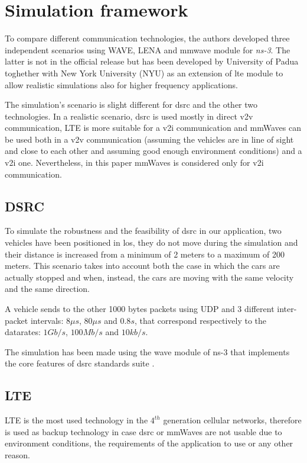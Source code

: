 
\section{Simulation framework}
\label{sec:simulation_framework}
To compare different communication technologies, the authors developed three independent scenarios using WAVE, LENA and mmwave module for \textit{ns-3}. The latter is not in the official release but has been developed by University of Padua toghether with New York University (NYU) as an extension of lte module to allow realistic simulations also for higher frequency applications. 

The simulation's scenario is slight different for \gls{dsrc} and the other two technologies. In a realistic scenario, \gls{dsrc} is used mostly in direct \gls{v2v} communication, LTE is more suitable for a \gls{v2i} communication and \gls{mmWaves} can be used both in a \gls{v2v} communication (assuming the vehicles are in line of sight and close to each other and assuming good enough environment conditions) and a \gls{v2i} one.
Nevertheless, in this paper \gls{mmWaves} is considered only for \gls{v2i} communication.

\subsection{DSRC}
\label{sec:dsrc_model}
To simulate the robustness and the feasibility of \gls{dsrc} in our application, two vehicles have been positioned in \gls{los}, they do not move during the simulation and their distance is increased from a minimum of 2 meters to a maximum of 200 meters. This scenario takes into account both the case in which the cars are actually stopped and when, instead, the cars are moving with the same velocity and the same direction.

A vehicle sends to the other 1000 bytes packets using UDP and 3 different inter-packet intervals: $8\mu s$, $80\mu s$ and $0.8s$, that correspond respectively to the datarates: $1Gb/s$, $100Mb/s$ and $10kb/s$.

The simulation has been made using the \gls{wave} module of ns-3 that implements the core features of \gls{dsrc} standards suite \cite{WAVEStandard}.

\subsection{LTE}
LTE is the most used technology in the $4^{th}$ generation cellular networks, therefore is used as backup technology in case \gls{dsrc} or \gls{mmWaves} are not usable due to environment conditions, the requirements of the application to use or any other reason.

